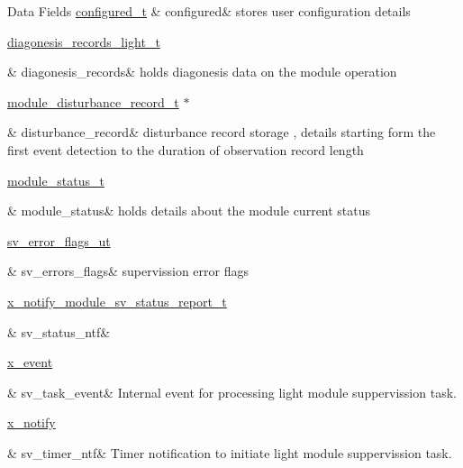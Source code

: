\begin{DoxyFields}{Data Fields}
\hypertarget{a00023_a94b2d1f6ea4ab334c74d24984dd27843}{\hyperlink{a00021_d6/d9c/a00352}{configured\+\_\+t}}\label{a00023_a94b2d1f6ea4ab334c74d24984dd27843}
&
configured&
stores user configuration details \\
\hline

\hypertarget{a00023_a7ae905b560513ad201e58c2f63375030}{\hyperlink{a00017_dd/dcb/a00375}{diagonesis\+\_\+records\+\_\+light\+\_\+t}}\label{a00023_a7ae905b560513ad201e58c2f63375030}
&
diagonesis\+\_\+records&
holds diagonesis data on the module operation \\
\hline

\hypertarget{a00023_ac9b38e2c1d3f1013a88d33506c754152}{\hyperlink{a00028}{module\+\_\+disturbance\+\_\+record\+\_\+t} $\ast$}\label{a00023_ac9b38e2c1d3f1013a88d33506c754152}
&
disturbance\+\_\+record&
disturbance record storage , details starting form the first event detection to the duration of observation record length \\
\hline

\hypertarget{a00023_a5a53c391562b059eb744ac679f3765ca}{\hyperlink{a00017_de/d94/a00603}{module\+\_\+status\+\_\+t}}\label{a00023_a5a53c391562b059eb744ac679f3765ca}
&
module\+\_\+status&
holds details about the module current status \\
\hline

\hypertarget{a00023_aaeec6b0609dba31393f337abf1cce3d3}{\hyperlink{a00022_d2/d5a/a00792}{sv\+\_\+error\+\_\+flags\+\_\+ut}}\label{a00023_aaeec6b0609dba31393f337abf1cce3d3}
&
sv\+\_\+errors\+\_\+flags&
supervission error flags \\
\hline

\hypertarget{a00023_afdc0e2c51e8e301d264700f4f9c10740}{\hyperlink{a00021_d7/d1b/a00864}{x\+\_\+notify\+\_\+module\+\_\+sv\+\_\+status\+\_\+report\+\_\+t}}\label{a00023_afdc0e2c51e8e301d264700f4f9c10740}
&
sv\+\_\+status\+\_\+ntf&
\\
\hline

\hypertarget{a00023_a43c345f39ea3aefbb60ef1ef57fe5d83}{\hyperlink{a00036_de/d37/a00849}{x\+\_\+event}}\label{a00023_a43c345f39ea3aefbb60ef1ef57fe5d83}
&
sv\+\_\+task\+\_\+event&
Internal event for processing light module suppervission task. \\
\hline

\hypertarget{a00023_ada91b200053f2d93e3639dc4ee3415b4}{\hyperlink{a00036_df/d4c/a00851}{x\+\_\+notify}}\label{a00023_ada91b200053f2d93e3639dc4ee3415b4}
&
sv\+\_\+timer\+\_\+ntf&
Timer notification to initiate light module suppervission task. \\
\hline

\end{DoxyFields}


